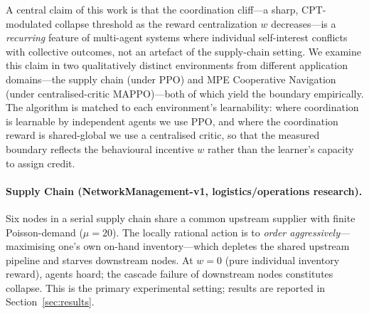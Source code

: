 \documentclass[letterpaper]{article}
\theoremstyle{plain}
\begin{document}
A central claim of this work is that the coordination cliff---a sharp, CPT-modulated
collapse threshold as the reward centralization $w$ decreases---is a
\emph{recurring} feature of multi-agent systems where individual self-interest
conflicts with collective outcomes, not an artefact of the supply-chain setting.
We examine this claim in two qualitatively distinct environments from different
application domains---the supply chain (under PPO) and MPE Cooperative Navigation
(under centralised-critic MAPPO)---both of which yield the boundary empirically.
The algorithm is matched to each environment's learnability: where coordination
is learnable by independent agents we use PPO, and where the coordination reward
is shared-global we use a centralised critic, so that the measured boundary
reflects the behavioural incentive $w$ rather than the learner's capacity to
assign credit.

\paragraph{Supply Chain (NetworkManagement-v1, logistics/operations research).}
Six nodes in a serial supply chain share a common upstream supplier with
finite Poisson-demand ($\mu=20$).  The locally rational action is to
\emph{order aggressively}---maximising one's own on-hand inventory---which
depletes the shared upstream pipeline and starves downstream nodes.
At $w{=}0$ (pure individual inventory reward), agents hoard; the cascade failure
of downstream nodes constitutes collapse.
This is the primary experimental setting; results are reported in
Section~\ref{sec:results}.
\end{document}
